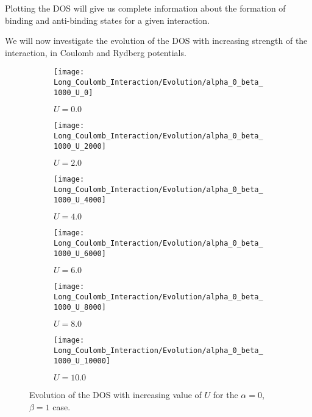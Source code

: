 \documentclass[a4paper, 11pt]{report}
\begin{document}
Plotting the DOS will give us complete information about the formation of binding and anti-binding states for a given interaction.

We will now investigate the evolution of the DOS with increasing strength of the interaction, in Coulomb and Rydberg potentials.

\begin{figure}[p!]
\centering
\begin{subfigure}{0.3\linewidth}
\texttt{[image: Long\_Coulomb\_Interaction/Evolution/alpha\_0\_beta\_1000\_U\_0]}
\caption{$U = 0.0$}
\end{subfigure}
\begin{subfigure}{0.3\linewidth}
	\texttt{[image: Long\_Coulomb\_Interaction/Evolution/alpha\_0\_beta\_1000\_U\_2000]}
	\caption{$U = 2.0$}
\end{subfigure}
\begin{subfigure}{0.3\linewidth}
	\texttt{[image: Long\_Coulomb\_Interaction/Evolution/alpha\_0\_beta\_1000\_U\_4000]}
	\caption{$U = 4.0$}
\end{subfigure}
\begin{subfigure}{0.3\linewidth}
	\texttt{[image: Long\_Coulomb\_Interaction/Evolution/alpha\_0\_beta\_1000\_U\_6000]}
	\caption{$U = 6.0$}
\end{subfigure}
\begin{subfigure}{0.3\linewidth}
	\texttt{[image: Long\_Coulomb\_Interaction/Evolution/alpha\_0\_beta\_1000\_U\_8000]}
	\caption{$U = 8.0$}
\end{subfigure}
\begin{subfigure}{0.3\linewidth}
	\texttt{[image: Long\_Coulomb\_Interaction/Evolution/alpha\_0\_beta\_1000\_U\_10000]}
	\caption{$U = 10.0$}
\end{subfigure}
\caption{Evolution of the DOS with increasing value of $U$ for the $\alpha = 0$, $\beta = 1$ case.}
\end{figure}
\end{document}
